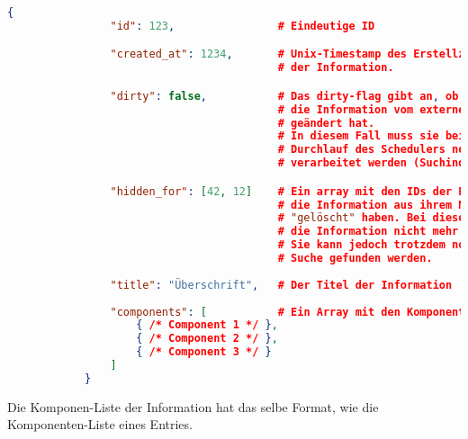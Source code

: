		\begin{lstlisting}[language=JSON]
			{
				"id": 123,                # Eindeutige ID

				"created_at": 1234,       # Unix-Timestamp des Erstellzeitpunktes
				                          # der Information.

				"dirty": false,           # Das dirty-flag gibt an, ob sich
				                          # die Information vom externen Service
				                          # geändert hat.
				                          # In diesem Fall muss sie beim nächsten
				                          # Durchlauf des Schedulers neu
				                          # verarbeitet werden (Suchindex!).

				"hidden_for": [42, 12]    # Ein array mit den IDs der Benutzer, die
				                          # die Information aus ihrem Newsfeed
				                          # "gelöscht" haben. Bei diesen wird 
				                          # die Information nicht mehr angezeigt.
				                          # Sie kann jedoch trotzdem noch über die
				                          # Suche gefunden werden.
				
				"title": "Überschrift",   # Der Titel der Information
				
				"components": [           # Ein Array mit den Komponenten der Information
					{ /* Component 1 */ },
					{ /* Component 2 */ },
					{ /* Component 3 */ }
				]
			}
		\end{lstlisting}

		Die Komponen-Liste der Information hat das selbe Format, wie die Komponenten-Liste eines Entries.

